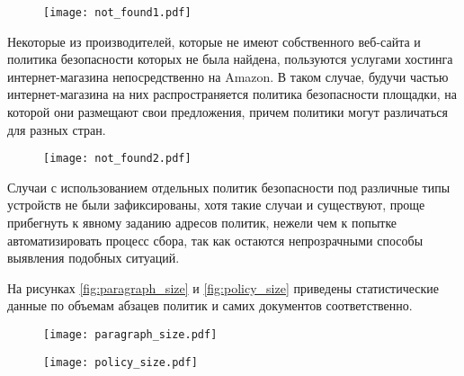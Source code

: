 \documentclass[../main]{subfiles}
\begin{document}
\begin{figure}[H]
    \centering
    {\texttt{[image: not\_found1.pdf]}}
    \vspace{-\baselineskip}
\end{figure}

Некоторые из производителей, которые не имеют собственного веб-сайта и политика безопасности которых не была найдена, пользуются услугами хостинга интернет-магазина непосредственно на Amazon. В таком случае, будучи частью интернет-магазина на них распространяется политика безопасности площадки, на которой они размещают свои предложения, причем политики могут различаться для разных стран.

\begin{figure}[H]
    \centering
    {\texttt{[image: not\_found2.pdf]}}
    \vspace{-\baselineskip}
\end{figure}

 Случаи с использованием отдельных политик безопасности под различные типы устройств не были зафиксированы, хотя такие случаи и существуют, проще прибегнуть к явному заданию адресов политик, нежели чем к попытке автоматизировать процесс сбора, так как остаются непрозрачными способы выявления подобных ситуаций.

На рисунках \ref{fig:paragraph_size} и \ref{fig:policy_size} приведены статистические данные по объемам абзацев политик и самих документов соответственно.

\begin{figure}[H]
    \centering
    {\texttt{[image: paragraph\_size.pdf]}}
    \vspace{-\baselineskip}
\end{figure}

\begin{figure}[H]
    \centering
    {\texttt{[image: policy\_size.pdf]}}
    \vspace{-\baselineskip}
\end{figure}
\end{document}
